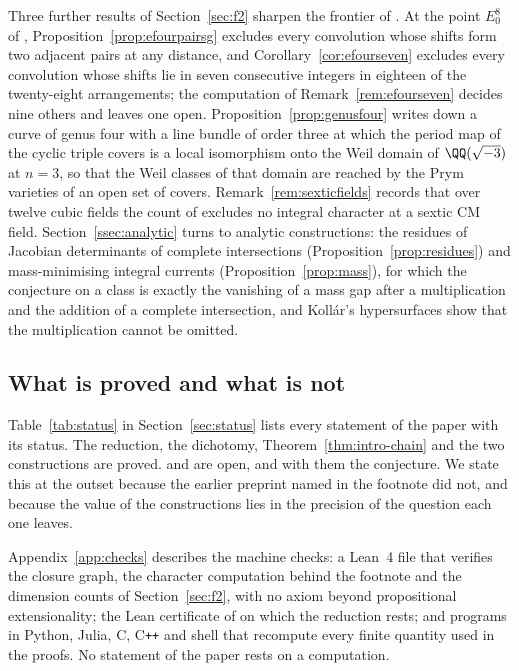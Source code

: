 Three further results of Section~\ref{sec:f2} sharpen the frontier of \Fii{}. At the point $E_{0}^{8}$ of \cite[\S18]{BMB26}, Proposition~\ref{prop:efourpairsg} excludes every convolution whose shifts form two adjacent pairs at any distance, and Corollary~\ref{cor:efourseven} excludes every convolution whose shifts lie in seven consecutive integers in eighteen of the twenty-eight arrangements; the computation of Remark~\ref{rem:efourseven} decides nine others and leaves one open. Proposition~\ref{prop:genusfour} writes down a curve of genus four with a line bundle of order three at which the period map of the cyclic triple covers is a local isomorphism onto the Weil domain of $\QQ(\sqrt{-3})$ at $n=3$, so that the Weil classes of that domain are reached by the Prym varieties of an open set of covers. Remark~\ref{rem:sexticfields} records that over twelve cubic fields the count of \cite[Prop.~19.47]{BMB26} excludes no integral character at a sextic CM field. Section~\ref{ssec:analytic} turns to analytic constructions: the residues of Jacobian determinants of complete intersections (Proposition~\ref{prop:residues}) and mass-minimising integral currents (Proposition~\ref{prop:mass}), for which the conjecture on a class is exactly the vanishing of a mass gap after a multiplication and the addition of a complete intersection, and Koll\'ar's hypersurfaces show that the multiplication cannot be omitted.

\subsection{What is proved and what is not}

Table~\ref{tab:status} in Section~\ref{sec:status} lists every statement of the paper with its status. The reduction, the dichotomy, Theorem~\ref{thm:intro-chain} and the two constructions are proved. \Fii{} and \Fiii{} are open, and with them the conjecture. We state this at the outset because the earlier preprint named in the footnote did not, and because the value of the constructions lies in the precision of the question each one leaves.

Appendix~\ref{app:checks} describes the machine checks: a Lean~4 file that verifies the closure graph, the character computation behind the footnote and the dimension counts of Section~\ref{sec:f2}, with no axiom beyond propositional extensionality; the Lean certificate of \cite{BMB26} on which the reduction rests; and programs in Python, Julia, C, C\texttt{++} and shell that recompute every finite quantity used in the proofs. No statement of the paper rests on a computation.
